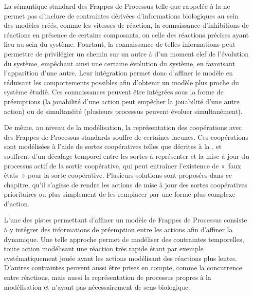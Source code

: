 La sémantique standard des Frappes de Processus telle que rappelée à la 
ne permet pas d'inclure de contraintes dérivées d'informations biologiques au sein
des modèles créés,
comme les vitesses de réaction,
la connaissance d'inhibitions de réactions en présence de certains composants,
ou celle des réactions précises ayant lieu au sein du système.
Pourtant, la connaissance de telles informations peut permettre de privilégier un chemin
sur un autre
à d'un moment clef de l'évolution du système, empêchant ainsi une certaine évolution du système,
en favorisant l'apparition d'une autre.
Leur intégration permet donc d'affiner le modèle en réduisant les comportements possibles
afin d'obtenir un modèle plus proche du système étudié.
Ces connaissances peuvent être intégrées sous la forme de préemptions (la jouabilité d'une action
peut empêcher la jouabilité d'une autre action) ou de simultanéité
(plusieurs processus peuvent évoluer simultanément).

De même, au niveau de la modélisation, la représentation des coopérations avec des Frappes de
Processus standards souffre de certaines lacunes.
Ces coopérations sont modélisées à l'aide de sortes coopératives telles que décrites à la
,
et souffrent d'un décalage temporel entre les sortes à représenter et
la mise à jour du processus actif de la sortie coopérative,
qui peut entraîner l'existence de «~faux états~» pour la sorte coopérative.
Plusieurs solutions sont proposées dans ce chapitre, qu'il s'agisse de rendre les actions de mise à
jour des sortes coopératives prioritaires ou plus simplement de les remplacer par une forme plus
complexe d'action.

L'une des pistes permettant d'affiner un modèle de Frappes de Processus consiste à y intégrer
des informations de préemption entre les actions afin d'affiner la dynamique.
Une telle approche permet de modéliser des contraintes temporelles,
toute action modélisant une réaction très rapide étant par exemple systématiquement jouée
avant les actions modélisant des réactions plus lentes.
D'autres contraintes peuvent aussi être prises en compte, comme la concurrence entre réactions,
mais aussi la représentation de processus propres à la modélisation et n'ayant pas nécessairement
de sens biologique.

